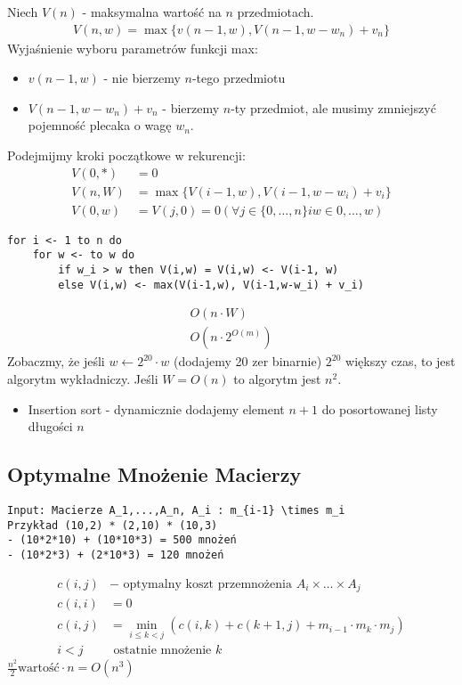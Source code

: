 \documentclass{article}
\numberwithin{equation}{subsection}
\begin{document}
\noindent
Niech $V(n)$ - maksymalna wartość na $n$ przedmiotach.
\begin{align}
    V(n,w) = \max \{v(n-1,w), V(n-1,w-w_n) + v_n \}
\end{align}
Wyjaśnienie wyboru parametrów funkcji max:
\begin{itemize}
    \item $v(n-1,w)$ - nie bierzemy $n$-tego przedmiotu
    \item $V(n-1,w-w_n) + v_n$ - bierzemy $n$-ty przedmiot, ale musimy zmniejszyć pojemność plecaka o wagę $w_n$.
\end{itemize}
Podejmijmy kroki początkowe w rekurencji:
\begin{align}
    V(0,*) &= 0\\
    V(n,W) &= \max \{V(i-1,w), V(i-1,w-w_i) + v_i\}\\
    V(0,w) &= V(j,0) = 0 \left(\forall j\in\{0,\dots,n\} i w\in{0,\dots,w}\right)
\end{align}
\begin{verbatim}
for i <- 1 to n do
    for w <- to w do
        if w_i > w then V(i,w) = V(i,w) <- V(i-1, w)
        else V(i,w) <- max(V(i-1,w), V(i-1,w-w_i) + v_i)
\end{verbatim}
\begin{align}
    O(n\cdot W)\\
    O(n\cdot 2^{O(m)})
\end{align}
Zobaczmy, że jeśli $w \leftarrow 2^{20}\cdot w$ (dodajemy 20 zer binarnie) $2^{20}$ większy czas, to jest algorytm wykładniczy.
Jeśli $W=O(n)$ to algorytm jest $n^2$.

\begin{itemize}
    \item Insertion sort - dynamicznie dodajemy element $n+1$ do posortowanej listy długości $n$
\end{itemize}

\subsection{Optymalne Mnożenie Macierzy}

\begin{verbatim}
Input: Macierze A_1,...,A_n, A_i : m_{i-1} \times m_i
Przykład (10,2) * (2,10) * (10,3)
- (10*2*10) + (10*10*3) = 500 mnożeń
- (10*2*3) + (2*10*3) = 120 mnożeń
\end{verbatim}

\begin{align}
    c(i,j) &- \text{ optymalny koszt przemnożenia } A_i \times \dots \times A_j\\
    c(i,i) &= 0\\
    c(i,j) &= \min_{i\leq k < j} \left(c(i,k) + c(k+1,j) + m_{i-1}\cdot m_k\cdot m_j \right)\\
    i<j & \text{ ostatnie mnożenie } k 
\end{align}
$\frac{n^2}{2} \text{wartość} \cdot n = O(n^3)$
\end{document}
